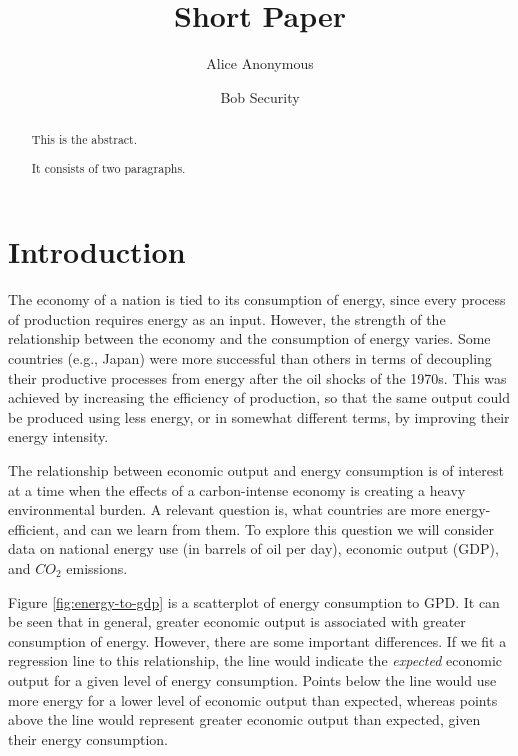 \documentclass[]{elsarticle} %
\begin{document}
\begin{frontmatter}

  \title{Short Paper}
    \author[Some Institute of Technology]{Alice Anonymous}
    \author[Another University]{Bob Security}
  
      \address[Some Institute of Technology]{Department, Street, City, State, Zip}
    \address[Another University]{Department, Street, City, State, Zip}
  
  \begin{abstract}
  This is the abstract.
  
  It consists of two paragraphs.
  \end{abstract}
  
 \end{frontmatter}

\hypertarget{introduction}{%
\section{Introduction}\label{introduction}}

The economy of a nation is tied to its consumption of energy, since
every process of production requires energy as an input. However, the
strength of the relationship between the economy and the consumption of
energy varies. Some countries (e.g., Japan) were more successful than
others in terms of decoupling their productive processes from energy
after the oil shocks of the 1970s. This was achieved by increasing the
efficiency of production, so that the same output could be produced
using less energy, or in somewhat different terms, by improving their
energy intensity.

The relationship between economic output and energy consumption is of
interest at a time when the effects of a carbon-intense economy is
creating a heavy environmental burden. A relevant question is, what
countries are more energy-efficient, and can we learn from them. To
explore this question we will consider data on national energy use (in
barrels of oil per day), economic output (GDP), and \(CO_2\) emissions.

Figure \ref{fig:energy-to-gdp} is a scatterplot of energy consumption to
GPD. It can be seen that in general, greater economic output is
associated with greater consumption of energy. However, there are some
important differences. If we fit a regression line to this relationship,
the line would indicate the \emph{expected} economic output for a given
level of energy consumption. Points below the line would use more energy
for a lower level of economic output than expected, whereas points above
the line would represent greater economic output than expected, given
their energy consumption.
\end{document}
